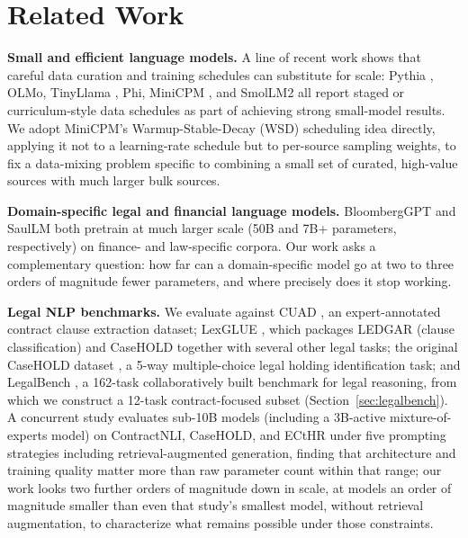 \documentclass[11pt]{article}
\begin{document}
\section{Related Work}

\textbf{Small and efficient language models.} A line of recent work shows
that careful data curation and training schedules can substitute for
scale: Pythia \citep{biderman2023pythia}, OLMo, TinyLlama
\citep{zhang2024tinyllama}, Phi, MiniCPM \citep{hu2024minicpm}, and
SmolLM2 \citep{allal2025smollm2} all report staged or curriculum-style
data schedules as part of achieving strong small-model results. We adopt
MiniCPM's Warmup-Stable-Decay (WSD) scheduling idea directly, applying it
not to a learning-rate schedule but to per-source sampling weights, to fix
a data-mixing problem specific to combining a small set of curated,
high-value sources with much larger bulk sources.

\textbf{Domain-specific legal and financial language models.} BloombergGPT
\citep{wu2023bloomberggpt} and SaulLM \citep{colombo2024saullm} both
pretrain at much larger scale (50B and 7B+ parameters, respectively) on
finance- and law-specific corpora. Our work asks a complementary question:
how far can a domain-specific model go at two to three orders of magnitude
fewer parameters, and where precisely does it stop working.

\textbf{Legal NLP benchmarks.} We evaluate against CUAD
\citep{hendrycks2021cuad}, an expert-annotated contract clause extraction
dataset; LexGLUE \citep{chalkidis2021lexglue}, which packages LEDGAR
(clause classification) and CaseHOLD together with several other legal
tasks; the original CaseHOLD dataset \citep{zheng2021casehold}, a
5-way multiple-choice legal holding identification task; and LegalBench
\citep{guha2023legalbench}, a 162-task collaboratively built benchmark
for legal reasoning, from which we construct a 12-task contract-focused
subset (Section~\ref{sec:legalbench}). A concurrent study
\citep{vaddi2026smallmodels} evaluates sub-10B models (including a
3B-active mixture-of-experts model) on ContractNLI, CaseHOLD, and ECtHR
under five prompting strategies including retrieval-augmented generation,
finding that architecture and training quality matter more than raw
parameter count within that range; our work looks two further orders of
magnitude down in scale, at models an order of magnitude smaller than
even that study's smallest model, without retrieval augmentation, to
characterize what remains possible under those constraints.
\end{document}

